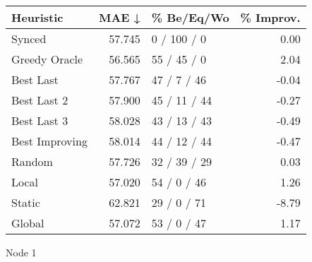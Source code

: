 \begin{tabular}{lrlr}
\toprule
\textbf{Heuristic} & \textbf{MAE ↓} & \textbf{\% Be/Eq/Wo} & \textbf{\% Improv.} \\
\midrule
            Synced &         57.745 &          0 / 100 / 0 &                0.00 \\
     Greedy Oracle &         56.565 &          55 / 45 / 0 &                2.04 \\
         Best Last &         57.767 &          47 / 7 / 46 &               -0.04 \\
       Best Last 2 &         57.900 &         45 / 11 / 44 &               -0.27 \\
       Best Last 3 &         58.028 &         43 / 13 / 43 &               -0.49 \\
    Best Improving &         58.014 &         44 / 12 / 44 &               -0.47 \\
            Random &         57.726 &         32 / 39 / 29 &                0.03 \\
             Local &         57.020 &          54 / 0 / 46 &                1.26 \\
            Static &         62.821 &          29 / 0 / 71 &               -8.79 \\
            Global &         57.072 &          53 / 0 / 47 &                1.17 \\
\bottomrule
\end{tabular}
\caption{Node 1}
\label{tab:non_lr05_le1_bs2_1}
